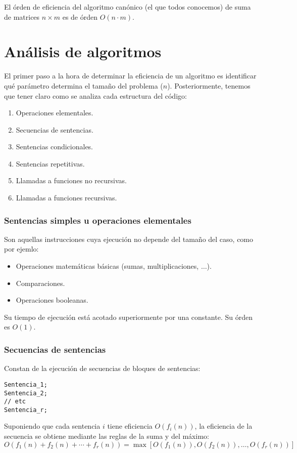 \begin{ejemplo}
El órden de eficiencia del algoritmo canónico (el que todos conocemos) de suma de matrices $n\times m$ es de órden $O(n\cdot m)$.
\end{ejemplo}

\section{Análisis de algoritmos}
El primer paso a la hora de determinar la eficiencia de un algoritmo es identificar qué parámetro determina el tamaño del problema ($n$).
Posteriormente, tenemos que tener claro como se analiza cada estructura del código:
\begin{enumerate}
    \item Operaciones elementales.
    \item Secuencias de sentencias.
    \item Sentencias condicionales.
    \item Sentencias repetitivas.
    \item Llamadas a funciones no recursivas.
    \item Llamadas a funciones recursivas.
\end{enumerate}

\subsubsection{Sentencias simples u operaciones elementales}
Son aquellas instrucciones cuya ejecución no depende del tamaño del caso, como por ejemlo:
\begin{itemize}
\item Operaciones matemáticas básicas (sumas, multiplicaciones, $\ldots$).
\item Comparaciones.
\item Operaciones booleanas.
\end{itemize}

Su tiempo de ejecución está acotado superiormente por una constante. Su órden es $O(1)$.

\subsubsection{Secuencias de sentencias}
Constan de la ejecución de secuencias de bloques de sentencias:
\begin{listing}[H]
    \begin{verbatim}
Sentencia_1;
Sentencia_2;
// etc
Sentencia_r;
    \end{verbatim}
\end{listing}
Suponiendo que cada sentencia $i$ tiene eficiencia $O(f_i(n))$, la eficiencia de la secuencia se obtiene mediante las reglas de la suma y del máximo:
\begin{equation*}
O(f_1(n) + f_2(n) + \cdots + f_r(n)) = \max\left[O(f_1(n)), O(f_2(n)), \ldots, O(f_r(n))\right]
\end{equation*}

